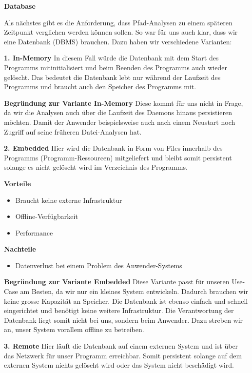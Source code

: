 \documentclass[a4paper,12pt]{report}
\begin{document}
        {\large\bfseries Database}

    Als nächstes gibt es die Anforderung, dass Pfad-Analysen zu einem späteren Zeitpunkt verglichen werden können sollen.
    So war für uns auch klar, dass wir eine Datenbank (DBMS) brauchen.
    Dazu haben wir verschiedene Varianten:

    \textbf{1. In-Memory}
    In diesem Fall würde die Datenbank mit dem Start des Programms mitinitialisiert und beim Beenden des Programms auch wieder gelöscht.
    Das bedeutet die Datenbank lebt nur während der Laufzeit des Programms und braucht auch den Speicher des Programms mit.

    \textbf{Begründung zur Variante In-Memory} Diese kommt für uns nicht in Frage, da wir die Analysen auch über die Laufzeit des Daemons hinaus persistieren möchten.
    Damit der Anwender beispielsweise auch nach einem Neustart noch Zugriff auf seine früheren Datei-Analysen hat.

    \textbf{2. Embedded}
    Hier wird die Datenbank in Form von Files innerhalb des Programms (Programm-Ressourcen) mitgeliefert und bleibt
    somit persistent solange es nicht gelöscht wird im Verzeichnis des Programms.

    \textbf{Vorteile}
    \begin{itemize}
        \item Braucht keine externe Infrastruktur
        \item Offline-Verfügbarkeit
        \item Performance
    \end{itemize}

    \textbf{Nachteile}
    \begin{itemize}
        \item Datenverlust bei einem Problem des Anwender-Systems
    \end{itemize}

    \textbf{Begründung zur Variante Embedded} Diese Variante passt für unseren Use-Case am Besten, da wir nur ein kleines System entwickeln.
    Dadurch brauchen wir keine grosse Kapazität an Speicher.
    Die Datenbank ist ebenso einfach und schnell eingerichtet und benötigt keine weitere Infrastruktur.
    Die Verantwortung der Datenbank liegt somit nicht bei uns, sondern beim Anwender.
    Dazu streben wir an, unser System vorallem offline zu betreiben.

    \textbf{3. Remote}
    Hier läuft die Datenbank auf einem externen System und ist über das Netzwerk für unser Programm erreichbar.
    Somit persistent solange auf dem externen System nichts gelöscht wird oder das System nicht beschädigt wird.
\end{document}
